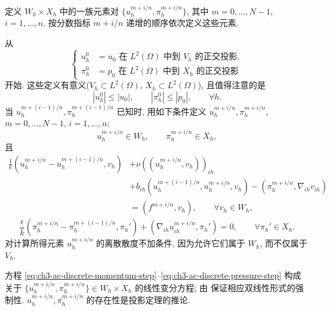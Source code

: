定义 $W_h\times X_h$ 中的一族元素对 $\{u_h^{m+i/n},\pi_h^{m+i/n}\}$, 其中 $m=0,\ldots,N-1$, $i=1,\ldots,n$. 按分数指标 $m+i/n$ 递增的顺序依次定义这些元素.

从
\begin{equation}
\left\{
\begin{aligned}
u_h^0&=u_0\text{ 在 }L^2(\Omega)\text{ 中到 }V_h\text{ 的正交投影},\\
\pi_h^0&=p_0\text{ 在 }L^2(\Omega)\text{ 中到 }X_h\text{ 的正交投影}
\end{aligned}
\right.
\label{eq:ch3-ac-discrete-initial-projections}
\end{equation}
开始. 这些定义有意义($V_h\subset L^2(\Omega)$, $X_h\subset L^2(\Omega)$), 且值得注意的是
\begin{equation}
|u_h^0|\leq|u_0|,
\qquad|\pi_h^0|\leq|p_0|,
\qquad\forall h.
\label{eq:ch3-ac-discrete-initial-stability}
\end{equation}
当 $u_h^{m+(i-1)/n},\pi_h^{m+(i-1)/n}$ 已知时, 用如下条件定义 $u_h^{m+i/n},\pi_h^{m+i/n}$, $m=0,\ldots,N-1$, $i=1,\ldots,n$:
\[
u_h^{m+i/n}\in W_h,
\qquad\pi_h^{m+i/n}\in X_h,
\]
且
\begin{equation}
\begin{aligned}
\frac1k(u_h^{m+i/n}-u_h^{m+(i-1)/n},v_h)
&+\nu((u_h^{m+i/n},v_h))_{ih}\\
&+b_{ih}(u_h^{m+(i-1)/n},u_h^{m+i/n},v_h)
-(\pi_h^{m+i/n},\nabla_{ih}v_{ih})\\
&=(f^{m+i/n},v_h),
\qquad\forall v_h\in W_h,
\end{aligned}
\label{eq:ch3-ac-discrete-momentum-step}
\end{equation}
\begin{equation}
\frac\epsilon k(\pi_h^{m+i/n}-\pi_h^{m+(i-1)/n},\pi_h')
+(\nabla_{ih}u_{ih}^{m+i/n},\pi_h')=0,
\qquad\forall\pi_h'\in X_h.
\label{eq:ch3-ac-discrete-pressure-step}
\end{equation}
对计算所得元素 $u_h^{m+i/n}$ 的离散散度不加条件, 因为允许它们属于 $W_h$, 而不仅属于 $V_h$.

方程 \eqref{eq:ch3-ac-discrete-momentum-step}--\eqref{eq:ch3-ac-discrete-pressure-step} 构成关于 $\{u_h^{m+i/n},\pi_h^{m+i/n}\}\in W_h\times X_h$ 的线性变分方程; 由  保证相应双线性形式的强制性. $u_h^{m+i/n},\pi_h^{m+i/n}$ 的存在性是投影定理的推论.

